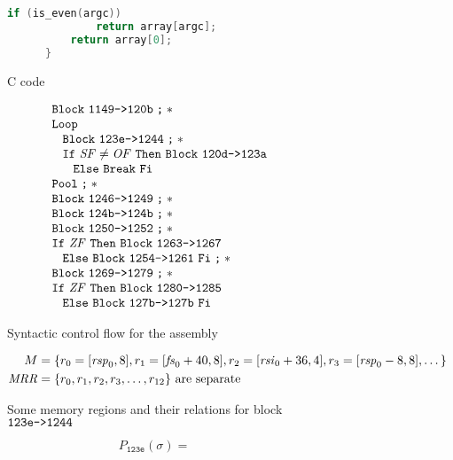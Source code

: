 \begin{figure}
\begin{subfigure}[b]{.53\linewidth}
\begin{lstlisting}[language=C, gobble=6]
          if (is_even(argc))
              return array[argc];
          return array[0];
      }
    \end{lstlisting}
    \caption{C code}\label{fig:example2-c}
  \end{subfigure}
  \hfill
  \begin{subfigure}[b]{.46\linewidth}
    \begin{equation*}
      \begin{array}{l}
        \ABB~\Block{1149}{120b}\ASeq* \\
        \AWhile \\
        \ind{2ex}\ABB~\Block{123e}{1244}\ASeq* \\
        \ind{2ex}\AIf~\var{SF}\neq\var{OF}~\AThen~\ABB~\Block{120d}{123a} \\
        \ind{4ex}\AElse~\ABreak~\AFi \\
        \AOd\ASeq* \\
        \ABB~\Block{1246}{1249}\ASeq* \\
        \ABB~\Block{124b}{124b}\ASeq* \\
        \ABB~\Block{1250}{1252}\ASeq* \\
        \AIf~\var{ZF}~\AThen~\ABB~\Block{1263}{1267} \\
        \ind{2ex}\AElse~\ABB~\Block{1254}{1261}~\AFi\ASeq* \\
        \ABB~\Block{1269}{1279}\ASeq* \\
        \AIf~\var{ZF}~\AThen~\ABB~\Block{1280}{1285} \\
        \ind{2ex}\AElse~\ABB~\Block{127b}{127b}~\AFi
      \end{array}
    \end{equation*}
    \caption{Syntactic control flow for the assembly}\label{fig:example2-scf}
  \end{subfigure}
  \begin{subfigure}{\linewidth}
    \begin{align*}
      M &=\{r_0=\region{\rspo}8, r_1=\region{\fso+40}8, r_2=\region{\rsio+36}4,
            r_3=\region{\rspo-8}8,\dotsc\} \\
      \var{MRR} &= \{r_0,r_1,r_2,r_3,\dotsc,r_{12}\}\text{ are separate}
    \end{align*}
    \caption{Some memory regions and their relations for block $\Block{123e}{1244}$}
  \end{subfigure}
  \begin{subfigure}{\linewidth}
    \begin{equation*}
      P_\mathtt{123e}(\sigma)=\begin{aligned}

\end{aligned}
\end{equation*}
\end{subfigure}
\end{figure}
